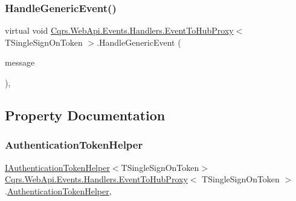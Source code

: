 \subsubsection{\texorpdfstring{Handle\+Generic\+Event()}{HandleGenericEvent()}}
{\footnotesize\ttfamily virtual void \hyperlink{classCqrs_1_1WebApi_1_1Events_1_1Handlers_1_1EventToHubProxy}{Cqrs.\+Web\+Api.\+Events.\+Handlers.\+Event\+To\+Hub\+Proxy}$<$ T\+Single\+Sign\+On\+Token $>$.Handle\+Generic\+Event (\begin{DoxyParamCaption}\item[{\hyperlink{interfaceCqrs_1_1Events_1_1IEvent}{I\+Event}$<$ T\+Single\+Sign\+On\+Token $>$}]{message }\end{DoxyParamCaption})\hspace{0.3cm}{\ttfamily [protected]}, {\ttfamily [virtual]}}



\subsection{Property Documentation}
\mbox{\label{classCqrs_1_1WebApi_1_1Events_1_1Handlers_1_1EventToHubProxy_af17155895dcb10f4288094a20f271372_af17155895dcb10f4288094a20f271372}} 
\subsubsection{\texorpdfstring{Authentication\+Token\+Helper}{AuthenticationTokenHelper}}
{\footnotesize\ttfamily \hyperlink{interfaceCqrs_1_1Authentication_1_1IAuthenticationTokenHelper}{I\+Authentication\+Token\+Helper}$<$T\+Single\+Sign\+On\+Token$>$ \hyperlink{classCqrs_1_1WebApi_1_1Events_1_1Handlers_1_1EventToHubProxy}{Cqrs.\+Web\+Api.\+Events.\+Handlers.\+Event\+To\+Hub\+Proxy}$<$ T\+Single\+Sign\+On\+Token $>$.\hyperlink{classCqrs_1_1Authentication_1_1AuthenticationTokenHelper}{Authentication\+Token\+Helper}\hspace{0.3cm}{\ttfamily [get]}, {\ttfamily [protected]}}

